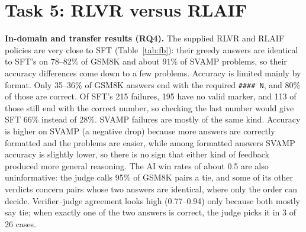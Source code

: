 \documentclass{article}
\begin{document}
\section{Task 5: RLVR versus RLAIF}
\begin{table}[!ht]
\centering\small
\caption{GSM8K and SVAMP (greedy, 512-token cap). Format: parseable \texttt{\#\#\#\# N}. AI win: tie = 0.5 (ties in brackets). Agree: judge verdict matches the verifier's (in brackets: correct choices when exactly one answer is correct). Drop: GSM8K minus SVAMP accuracy.}
\label{tab:fb}
\setlength{\tabcolsep}{4pt}
\end{table}

\textbf{In-domain and transfer results (RQ4).} The supplied RLVR and RLAIF policies are very close to SFT (Table~\ref{tab:fb}): their greedy answers are identical to SFT's on 78--82\% of GSM8K and about 91\% of SVAMP problems, so their accuracy differences come down to a few problems. Accuracy is limited mainly by format. Only 35--36\% of GSM8K answers end with the required \texttt{\#\#\#\# N}, and 80\% of those are correct. Of SFT's 215 failures, 195 have no valid marker, and 113 of those still end with the correct number, so checking the last number would give SFT 66\% instead of 28\%. SVAMP failures are mostly of the same kind. Accuracy is higher on SVAMP (a negative drop) because more answers are correctly formatted and the problems are easier, while among formatted answers SVAMP accuracy is slightly lower, so there is no sign that either kind of feedback produced more general reasoning. The AI win rates of about 0.5 are also uninformative: the judge calls 95\% of GSM8K pairs a tie, and some of its other verdicts concern pairs whose two answers are identical, where only the order can decide. Verifier--judge agreement looks high (0.77--0.94) only because both mostly say tie; when exactly one of the two answers is correct, the judge picks it in 3 of 26 cases.
\end{document}
